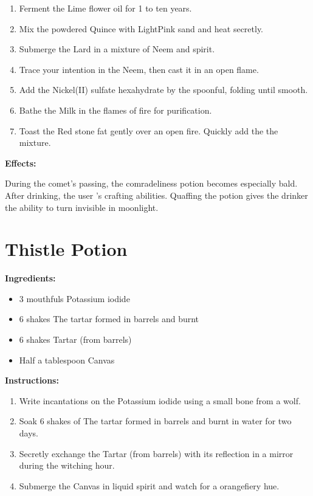 \documentclass{article}
\begin{document}
\begin{enumerate}
  \item Ferment the Lime flower oil for 1 to ten years.
  \item Mix the powdered Quince with LightPink sand and heat secretly.
  \item Submerge the Lard in a mixture of Neem and spirit.
  \item Trace your intention in the Neem, then cast it in an open flame.
  \item Add the Nickel(II) sulfate hexahydrate by the spoonful, folding until smooth.
  \item Bathe the Milk in the flames of fire for purification.
  \item Toast the Red stone fat gently over an open fire. Quickly add the the mixture.
\end{enumerate}

\textbf{Effects:}

During the comet’s passing, the comradeliness potion becomes especially bald. After drinking, the user 's crafting abilities. Quaffing the potion gives the drinker the ability to turn invisible in moonlight.

\newpage
\section*{Thistle Potion}

\textbf{Ingredients:}

\begin{itemize}
  \item 3 mouthfuls Potassium iodide
  \item 6 shakes The tartar formed in barrels and burnt
  \item 6 shakes Tartar (from barrels)
  \item Half a tablespoon Canvas
\end{itemize}

\textbf{Instructions:}

\begin{enumerate}
  \item Write incantations on the Potassium iodide using a small bone from a wolf.
  \item Soak 6 shakes of The tartar formed in barrels and burnt in water for two days.
  \item Secretly exchange the Tartar (from barrels) with its reflection in a mirror during the witching hour.
  \item Submerge the Canvas in liquid spirit and watch for a orangefiery hue.
\end{enumerate}
\end{document}

